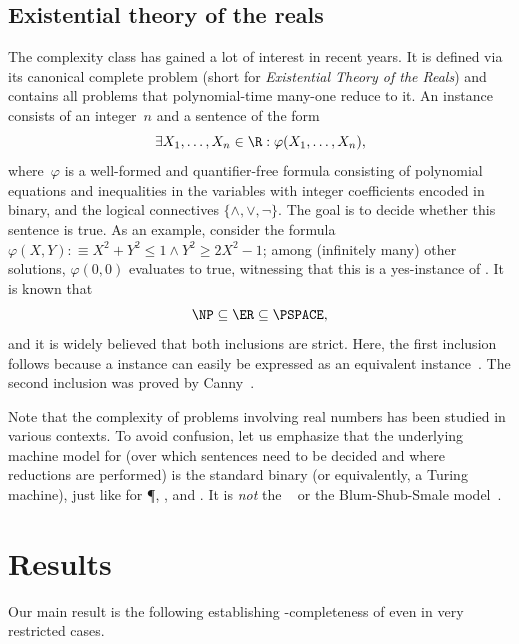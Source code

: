 \subsection{Existential theory of the reals}
The complexity class \ER has gained a lot of interest in recent years.
It is defined via its canonical complete problem \ETR (short for \emph{Existential Theory of the Reals}) and contains all problems that polynomial-time many-one reduce to it.
An \ETR instance consists of an integer~$n$ and a sentence of the form
\[
    \exists X_1, \ldots, X_n \in \R :
    \varphi(X_1, \ldots, X_n),
\]
where~$\varphi$ is a well-formed and quantifier-free formula consisting of polynomial equations and inequalities in the variables with integer coefficients encoded in binary, and the logical connectives $\{\land, \lor, \lnot\}$.
The goal is to decide whether this sentence is true.
As an example, consider the formula $\varphi(X,Y) :\equiv X^2 + Y^2 \leq 1 \land Y^2 \geq 2X^2 - 1$;
among (infinitely many) other solutions, $\varphi(0,0)$ evaluates to true, witnessing that this is a yes-instance of \ETR.
It is known that
\[
    \NP \subseteq \ER \subseteq \PSPACE
    \text{,}
\]
and it is widely believed that both inclusions are strict.
Here, the first inclusion follows because a  instance can easily be expressed as an equivalent \ETR instance~\cite{Shor1991_Stretchability}.
The second inclusion was proved by Canny~\cite{Canny1988_PSPACE}.

Note that the complexity of problems involving real numbers %
has been  %
studied in various contexts.
To avoid confusion, let us emphasize that the underlying machine model for \ER 
(over which sentences need to be decided and where
reductions are %
performed)  %
is the standard binary \wordRAM (or equivalently, a Turing machine), just 
like for \P, \NP, and \PSPACE.
It is \emph{not} the \realRAM~\cite{Erickson2022_SmoothingTheGap} or the Blum-Shub-Smale model~\cite{Blum1989_ComputationOverTheReals}.

\section{Results}
\label{sec:results}

Our main result is the following  establishing \ER-completeness
of \trainNN even in very restricted cases. %

